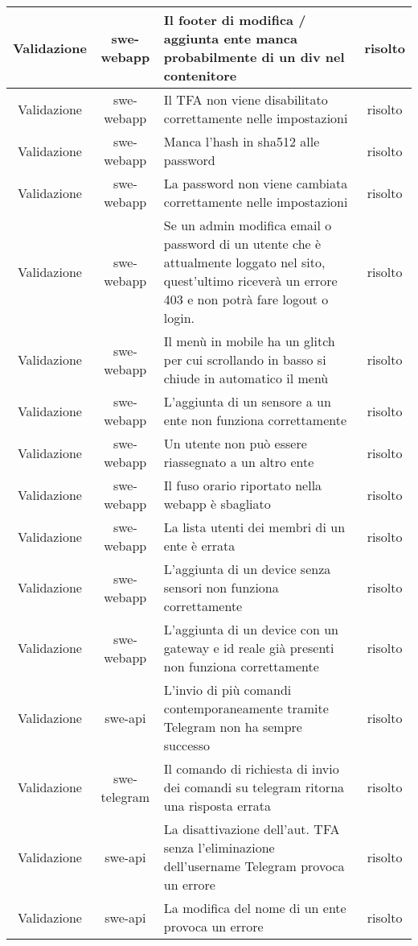 \begin{center}
\begin{longtable}{|c|c|p{8cm}|c|}
	    \hline
	    Validazione & swe-webapp & Il footer di modifica / aggiunta ente manca probabilmente di un div nel contenitore & risolto \\
	    \hline
	    Validazione & swe-webapp & Il TFA non viene disabilitato correttamente nelle impostazioni & risolto \\
	    \hline
	    Validazione & swe-webapp & Manca l'hash in sha512 alle password & risolto \\
	    \hline
	    Validazione & swe-webapp & La password non viene cambiata correttamente nelle impostazioni & risolto \\
	    \hline
	    Validazione & swe-webapp & Se un admin modifica email o password di un utente che è attualmente loggato nel sito, quest'ultimo riceverà un errore 403 e non potrà fare logout o login. & risolto \\
	    \hline
	    Validazione & swe-webapp & Il menù in mobile ha un glitch per cui scrollando in basso si chiude in automatico il menù  & risolto \\
	    \hline
	    Validazione & swe-webapp & L'aggiunta di un sensore a un ente non funziona correttamente & risolto \\
	    \hline
	    Validazione & swe-webapp & Un utente non può essere riassegnato a un altro ente & risolto \\
	    \hline
	    Validazione & swe-webapp & Il fuso orario riportato nella webapp è sbagliato & risolto \\
	    \hline
	    Validazione & swe-webapp & La lista utenti dei membri di un ente è errata & risolto \\
	    \hline
	    Validazione & swe-webapp & L'aggiunta di un device senza sensori non funziona correttamente & risolto \\
	    \hline
	    Validazione & swe-webapp & L'aggiunta di un device con un gateway e id reale già presenti non funziona correttamente & risolto \\
	    \hline
	    Validazione & swe-api & L'invio di più comandi contemporaneamente tramite Telegram non ha sempre successo & risolto \\
	    \hline
	    Validazione & swe-telegram & Il comando di richiesta di invio dei comandi su telegram ritorna una risposta errata & risolto \\
	    \hline
	    Validazione & swe-api & La disattivazione dell'aut. TFA senza l'eliminazione dell'username Telegram provoca un errore & risolto \\
	    \hline
	    Validazione & swe-api & La modifica del nome di un ente provoca un errore  & risolto \\

\end{longtable}
\end{center}
